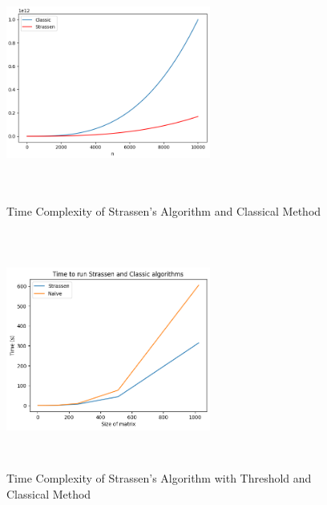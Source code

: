 \documentclass{article}
\begin{document}
\begin{figure}[h!]
    \centering
    \includegraphics[width=0.6\textwidth, height=7.8cm]{figs/time_3.png}
    \caption{Time Complexity of Strassen's Algorithm and Classical Method}
\end{figure}

\begin{figure}[h!]
    \centering
    \includegraphics[width=0.6\textwidth, height=7.8cm]{figs/time_4.png}
    \caption{Time Complexity of Strassen's Algorithm with Threshold and Classical Method}
\end{figure}
\end{document}
